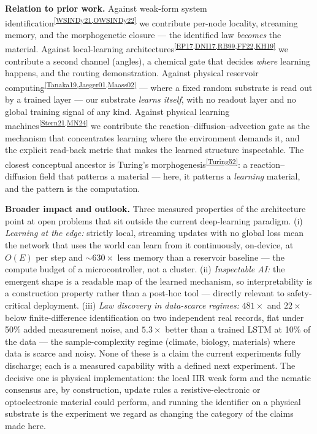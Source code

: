 \documentclass[10pt]{article}
\newcommand{\natref}[1]{\textsuperscript{\ref{#1}}}
\begin{document}
\textbf{Relation to prior work.} Against weak-form system
identification\natref{WSINDy21,OWSINDy22} we contribute per-node locality, streaming
memory, and the morphogenetic closure --- the identified law \emph{becomes} the
material. Against local-learning
architectures\natref{EP17,DNI17,RB99,FF22,KH19} we contribute a second channel (angles),
a chemical gate that decides \emph{where} learning happens, and the routing
demonstration. Against physical reservoir
computing\natref{Tanaka19,Jaeger01,Maass02} --- where a fixed random substrate is read
out by a trained layer --- our substrate \emph{learns itself}, with no readout layer and
no global training signal of any kind. Against physical learning
machines\natref{Stern21,MN24} we contribute the reaction--diffusion--advection gate as
the mechanism that concentrates learning where the environment demands it, and the
explicit read-back metric that makes the learned structure inspectable. The closest
conceptual ancestor is Turing's morphogenesis\natref{Turing52}: a reaction--diffusion
field that patterns a material --- here, it patterns a \emph{learning} material, and the
pattern is the computation.

\textbf{Broader impact and outlook.} Three measured properties of the architecture
point at open problems that sit outside the current deep-learning paradigm. (i)
\emph{Learning at the edge:} strictly local, streaming updates with no global loss
mean the network that uses the world can learn from it continuously, on-device, at
$O(E)$ per step and ${\sim}630\times$ less memory than a reservoir baseline --- the
compute budget of a microcontroller, not a cluster. (ii) \emph{Inspectable AI:} the
emergent shape is a readable map of the learned mechanism, so interpretability is a
construction property rather than a post-hoc tool --- directly relevant to
safety-critical deployment. (iii) \emph{Law discovery in data-scarce regimes:}
$481\times$ and $22\times$ below finite-difference identification on two independent
real records, flat under 50\% added measurement noise, and $5.3\times$ better than a
trained LSTM at 10\% of the data --- the sample-complexity regime (climate, biology,
materials) where data is scarce and noisy. None of these is a claim the current
experiments fully discharge; each is a measured capability with a defined next
experiment. The decisive one is physical implementation: the local IIR weak form and
the nematic consensus are, by construction, update rules a resistive-electronic or
optoelectronic material could perform, and running the identifier on a physical
substrate is the experiment we regard as changing the category of the claims made
here.
\end{document}
